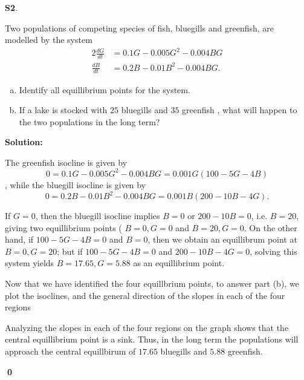 \documentclass{article}
\newenvironment{problem}[1]
{
  \begin{flushleft}
  \textbf{#1}.
  \ignorespaces
}
{
  \end{flushleft}
}
\newenvironment{solution}
{
  \ignorespaces
  \textbf{Solution:}
}
{
  \ignorespacesafterend
  \begin{flushright}
  {\bfseries \qed}
  \end{flushright}
}
\begin{document}
\begin{problem}{S2}
Two populations of competing species of fish, bluegills and greenfish, are modelled by the system
\begin{alignat*}{2}
\frac{dG}{dt} &= 0.1G - 0.005G^2 - 0.004BG \\
\frac{dB}{dt} & = 0.2B - 0.01B^2 - 0.004BG.
\end{alignat*}
\begin{enumerate}[(a)]
\item Identify all equillibrium points for the system.
\item If a lake is stocked with \(25\) bluegills and \(35\) greenfish , what will happen to the two populations in the long term?
\end{enumerate}
\end{problem}
\begin{solution}

The greenfish isocline is given by \[0=0.1G-0.005G^2-0.004BG=0.001G(100-5G-4B)\], while the bluegill isocline is given by 
\[0=0.2B-0.01B^2-0.004BG=0.001B(200-10B-4G).\]

If \(G=0\), then the bluegill isocline implies \(B=0\) or \(200-10B=0\), i.e. \(B=20\), giving two equillibrium points ( \(B=0,G=0\) and \(B=20,G=0\).  On the other hand, if \(100-5G-4B=0\) and \(B=0\), then we obtain an equillibrum point at \(B=0,G=20\); but if \(100-5G-4B=0\) and  \(200-10B-4G=0\), solving this system yields  \( B=17.65, G=5.88\) as an equillibrium point.


Now that we have identified the four equillbrium points, to answer part (b), we plot the isoclines, and the general direction of the slopes in each of the four regions

\begin{center}
\end{center}

Analyzing the slopes in each of the four regions on the graph shows that the central equillibrium point is a sink.  Thus, in the long term the populations will approach the central equillbirum of \(17.65\) bluegills and \(5.88\) greenfish.


\end{solution}
\end{document}
